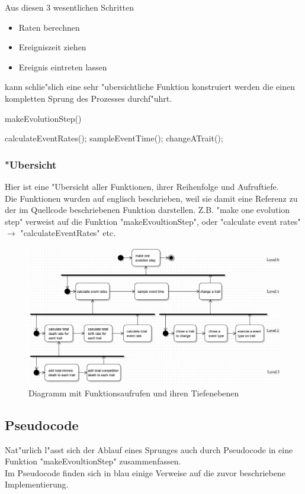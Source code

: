 \documentclass[11pt, a4paper, german]{article}
\theoremstyle{plain}
\begin{document}
	Aus diesen 3 wesentlichen Schritten
	\begin{itemize}
		\item Raten berechnen
		\item Ereigniszeit ziehen
		\item Ereignis eintreten lassen
	\end{itemize}
	kann schlie"slich eine sehr "ubersichtliche Funktion konstruiert werden die einen kompletten Sprung des Prozesses durchf"uhrt.
	\begin{algorithm}[H]
 		\caption{makeEvolutionStep()}
 		\begin{algorithmic}[1]
 			\State calculateEventRates();
 			\State sampleEventTime();
 			\State changeATrait();
 		\end{algorithmic}
 	\end{algorithm}
	 	
	\subsubsection{"Ubersicht}
	Hier ist eine "Ubersicht aller Funktionen, ihrer Reihenfolge und Aufruftiefe. \\
	Die Funktionen wurden auf englisch beschrieben, weil sie damit eine Referenz zu der im Quellcode beschriebenen Funktion darstellen. Z.B. "{}make one evolution step"{} verweist auf die Funktion "{}makeEvoultionStep"{}, oder "{}calculate event rates"{} $ \to $ "{}calculateEventRates"{} etc.
	\begin{figure}[H]
		\centering
		\includegraphics[width=1\linewidth]{../UMLs/PseudoCodeForBThesis}
		\caption{Diagramm mit Funktionsaufrufen und ihren Tiefenebenen}
		\label{fig:PseudoCodeForBThesis}
	\end{figure}
	
	\subsection{Pseudocode}
	Nat"urlich l"asst sich der Ablauf eines Sprunges auch durch Pseudocode in eine Funktion "{}makeEvoultionStep"{} zusammenfassen.\\
	Im Pseudocode finden sich in blau einige Verweise auf die zuvor beschriebene Implementierung.
	
\end{document}
